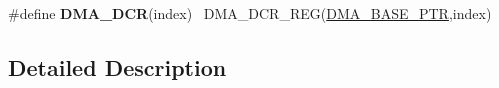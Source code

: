 \begin{DoxyCompactItemize}
\item 
\hypertarget{group___d_m_a___register___accessor___macros_ga8f4a66782bf3653a172fc177cd6330a1}{}\#define {\bfseries D\+M\+A\+\_\+\+D\+C\+R}(index)                                                  ~D\+M\+A\+\_\+\+D\+C\+R\+\_\+\+R\+E\+G(\hyperlink{group___d_m_a___peripheral_ga6997fbc1b1973e9f27170217a3bd6f22}{D\+M\+A\+\_\+\+B\+A\+S\+E\+\_\+\+P\+T\+R},index)\label{group___d_m_a___register___accessor___macros_ga8f4a66782bf3653a172fc177cd6330a1}

\end{DoxyCompactItemize}


\subsection{Detailed Description}
